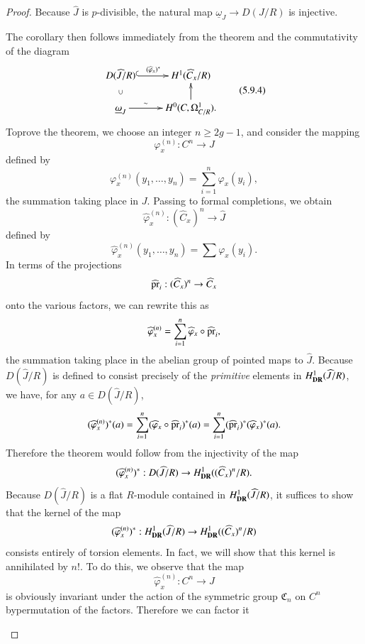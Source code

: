 \begin{proof}
Because $\widehat{J}$ is $p$-divisible, the natural map $\underline{\omega}_{J}\to D(J/R)$ is injective.

The corollary then follows immediately from the theorem and the commutativity of the diagram
\begin{equation*}
\vcenter{
\xymatrix@R=.5cm{
D(\widehat{J}/R)\ar@{^(->}[r]^-{(\widehat{\varphi}_{x})^{*}} & H^{1}(\widehat{C}_{x}/R)\\
\underline{\omega}_{J}\ar@{}[u]|{\cup}\ar[r]^-{\sim} & H^{0}(C,\Omega^{1}_{C/R}).\ar[u]
}}\tag{5.9.4}\label{art6-eq5.9.4}
\end{equation*}
To\pageoriginale prove the theorem, we choose an integer $n\geq 2g-1$, and consider the mapping
$$
\varphi^{(n)}_{x}:C^{n}\to J
$$
defined by
$$
\varphi^{(n)}_{x}(y_{1},\ldots,y_{n})=\sum\limits^{n}_{i=1}\varphi_{x}(y_{i}),
$$
the summation taking place in $J$. Passing to formal completions, we obtain 
$$
\widehat{\varphi}^{(n)}_{x}:(\widehat{C}_{x})^{n}\to \widehat{J}
$$
defined by
$$
\widehat{\varphi}^{(n)}_{x}(y_{1},\ldots,y_{n})=\sum \varphi_{x}(y_{i}).
$$
In terms of the projections
$$
\widehat{\operatorname{pr}}_{i}:(\widehat{C}_{x})^{n}\to \widehat{C}_{x}
$$
onto the various factors, we can rewrite this as
$$
\widehat{\varphi}^{(n)}_{x}=\sum\limits^{n}_{i=1}\widehat{\varphi}_{x}\circ \widehat{\operatorname{pr}}_{i},
$$
the summation taking place in the abelian group of pointed maps to $\widehat{J}$. Because $D(\widehat{J}/R)$ is defined to consist precisely of the {\em primitive} elements in $H^{1}_{\mathbf{DR}}(\widehat{J}/R)$, we have, for any $a\in D(\widehat{J}/R)$,
$$
(\widehat{\varphi}^{(n)}_{x})^{*}(a)=\sum\limits^{n}_{i=1}(\widehat{\varphi}_{x}\circ \widehat{\operatorname{pr}}_{i})^{*}(a)=\sum\limits^{n}_{i=1}(\widehat{\operatorname{pr}}_{i})^{*}(\widehat{\varphi}_{x})^{*}(a).
$$
Therefore the theorem would follow from the injectivity of the map
$$
(\widehat{\varphi}^{(n)}_{x})^{*}:D(\widehat{J}/R)\to H^{1}_{\mathbf{DR}}((\widehat{C}_{x})^{n}/R).
$$
Because $D(\widehat{J}/R)$ is a flat $R$-module contained in $H^{1}_{\mathbf{DR}}(\widehat{J}/R)$, it suffices to show that the kernel of the map
$$
(\widehat{\varphi}_{x}^{(n)})^{*}:H^{1}_{\mathbf{DR}}(\widehat{J}/R)\to H^{1}_{\mathbf{DR}}((\widehat{C}_{x})^{n}/R)
$$
consists entirely of torsion elements. In fact, we will show that this kernel is annihilated by $n!$. To do this, we observe that the map
$$
\widehat{\varphi}^{(n)}_{x}:C^{n}\to J
$$
is obviously invariant under the action of the symmetric group $\mathfrak{C}_{n}$ on $C^{n}$ by\pageoriginale permutation of the factors. Therefore we can factor it
\begin{figure}[H]

\end{figure}
\end{proof}
